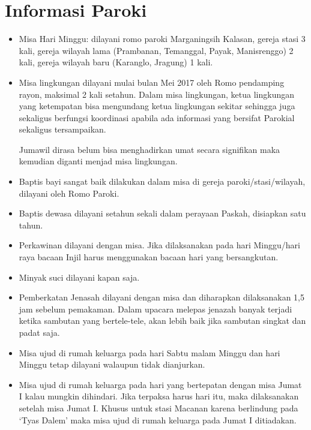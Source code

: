 \section{Informasi Paroki}
\begin{itemize}
	\item Misa Hari Minggu: dilayani romo paroki Marganingsih Kalasan, gereja stasi 3 kali, gereja wilayah lama (Prambanan, Temanggal, Payak, Manisrenggo) 2 kali, gereja wilayah baru (Karanglo, Jragung) 1 kali.

	\item Misa lingkungan dilayani mulai bulan Mei 2017 oleh Romo pendamping rayon, maksimal 2 kali setahun. Dalam misa lingkungan, ketua lingkungan yang ketempatan bisa mengundang ketua lingkungan sekitar sehingga juga sekaligus berfungsi koordinasi apabila ada informasi yang bersifat Parokial sekaligus tersampaikan.

	Jumawil dirasa belum bisa menghadirkan umat secara signifikan maka kemudian diganti menjad misa lingkungan.

	\item Baptis bayi sangat baik dilakukan dalam misa di gereja paroki/stasi/wilayah, dilayani oleh Romo Paroki.

	\item Baptis dewasa dilayani setahun sekali dalam perayaan Paskah, disiapkan satu tahun.
	
	\item Perkawinan dilayani dengan misa. Jika dilaksanakan pada hari Minggu/hari raya bacaan Injil harus menggunakan bacaan hari yang bersangkutan. 

	\item Minyak suci dilayani kapan saja.
	
	\item Pemberkatan Jenasah dilayani dengan misa dan diharapkan dilaksanakan 1,5 jam sebelum pemakaman. Dalam upacara melepas jenazah banyak terjadi ketika sambutan yang bertele-tele, akan lebih baik jika sambutan singkat dan padat saja.

	\item Misa ujud di rumah keluarga pada hari Sabtu malam Minggu dan hari Minggu tetap dilayani walaupun tidak dianjurkan.
	
	\item Misa ujud di rumah keluarga pada hari yang bertepatan dengan misa Jumat I kalau mungkin dihindari. Jika terpaksa harus hari itu, maka dilaksanakan setelah misa Jumat I. Khusus untuk stasi Macanan karena berlindung pada ‘Tyas Dalem’ maka misa ujud di rumah keluarga pada Jumat I ditiadakan.
\end{itemize}

